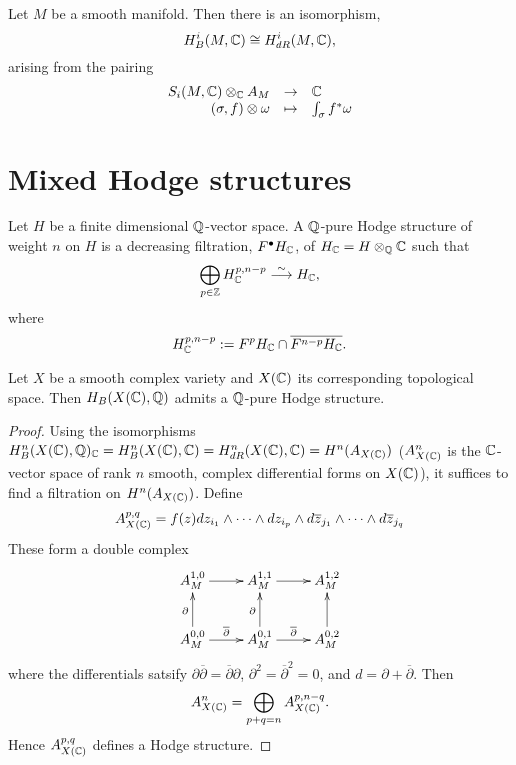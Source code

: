 \begin{thm}
Let $M$ be a smooth manifold. Then there is an isomorphism,
\[
H^i_B(M, \mathbb{C}) \cong H^i_{dR}(M, \mathbb{C}),
\]
arising from the pairing
\[
\begin{array}{rcl}
S_i(M,\mathbb{C}) \otimes_{\mathbb{C}} A_M & \to & \mathbb{C} \\
(\sigma, f) \otimes \omega & \mapsto & \int_{\sigma} f^* \omega
\end{array}
\]
\end{thm}

\section{Mixed Hodge structures}
\begin{defn}\label{def:qpurehodge}
Let $H$ be a finite dimensional $\mathbb{Q}$-vector space. A $\mathbb{Q}$-pure Hodge structure of weight $n$ on $H$ is a decreasing filtration, $F^{\bullet}H_{\mathbb{C}}$, of $H_{\mathbb{C}} = H \otimes_{\mathbb{Q}} \mathbb{C}$ such that
\[
\bigoplus_{p \in \mathbb{Z}} H^{p,n-p}_{\mathbb{C}} \stackrel{\sim}{\longrightarrow} H_{\mathbb{C}},
\]
where
\[
H^{p,n-p}_{\mathbb{C}} := F^p H_{\mathbb{C}} \cap \overline{F^{n-p}H_{\mathbb{C}}}.
\]
\end{defn}

\begin{thm}\label{thm:hodge}
Let $X$ be a smooth complex variety and $X(\mathbb{C})$ its corresponding topological space. Then $H_B(X(\mathbb{C}),\mathbb{Q})$ admits a $\mathbb{Q}$-pure Hodge structure.
\end{thm}
\begin{proof}
Using the isomorphisms $H^n_B(X(\mathbb{C}),\mathbb{Q})_{\mathbb{C}} = H^n_B(X(\mathbb{C}),\mathbb{C}) = H^n_{dR}(X(\mathbb{C}),\mathbb{C}) = H^n(A_{X(\mathbb{C})})$ ($A^n_{X(\mathbb{C})}$ is the $\mathbb{C}$-vector space of rank $n$ smooth, complex differential forms on $X(\mathbb{C})$), it suffices to find a filtration on $H^n(A_{X(\mathbb{C})})$. Define
\[
A^{p,q}_{X(\mathbb{C})} = f(z) dz_{i_1} \wedge \cdots \wedge dz_{i_p} \wedge d\overline{z}_{j_1} \wedge \cdots \wedge d\overline{z}_{j_q}
\]
These form a double complex
\[
\xymatrix{
A^{1,0}_M \ar[r] & A^{1,1}_M \ar[r] & A^{1,2}_M \\
A^{0,0}_M \ar[u]^{\partial} \ar[r]^{\overline{\partial}} & A^{0,1}_M \ar[u]^{\partial} \ar[r]^{\overline{\partial}} & A^{0,2}_M \ar[u]
}
\]
where the differentials satsify $\partial \overline{\partial} = \overline{\partial} \partial$, $\partial^2 = \overline{\partial}^2 = 0$, and $d = \partial + \overline{\partial}$. Then
\[
A^n_{X(\mathbb{C})} = \bigoplus_{p+q = n} A^{p,n-q}_{X(\mathbb{C})}.
\]
Hence $A^{p,q}_{X(\mathbb{C})}$ defines a Hodge structure.
\end{proof}

